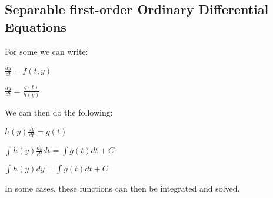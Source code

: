 
\subsection{Separable first-order Ordinary Differential Equations}

For some we can write:

\(\frac{dy}{dt}=f(t,y)\)

\(\frac{dy}{dt}=\frac{g(t)}{h(y)}\)

We can then do the following:

\(h(y)\frac{dy}{dt}=g(t)\)

\(\int h(y)\frac{dy}{dt}dt=\int g(t)dt + C\)

\(\int h(y)dy=\int g(t)dt + C\)

In some cases, these functions can then be integrated and solved.


